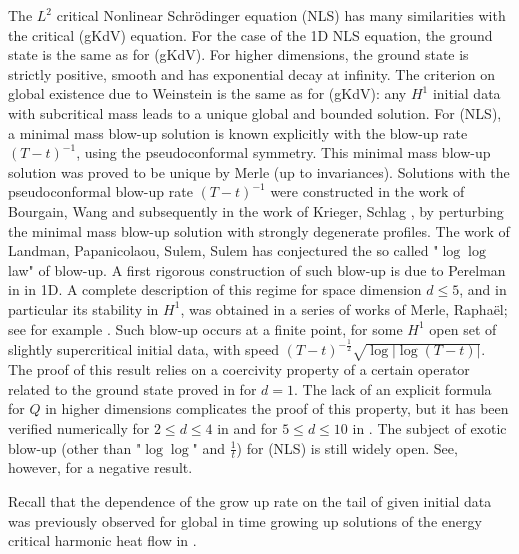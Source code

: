 \documentclass[16pt,english, oneside,reqno]{smfart}
\begin{document}
The $L^2$ critical Nonlinear Schr\"odinger equation (NLS) has many similarities with the critical (gKdV) equation. For the case of the 1D NLS equation, the ground state is the same as for (gKdV).
For higher dimensions, the ground state is strictly positive, smooth and has exponential decay 
at infinity.
The criterion on global existence due to Weinstein \cite{Weinstein-1983}
is the same as for (gKdV): any $H^1$ initial data with subcritical mass leads to
a unique global and bounded solution.
For (NLS), a minimal mass blow-up solution is known explicitly with the blow-up rate $(T-t)^{-1}$, using the pseudoconformal symmetry.
This minimal mass blow-up solution was proved to be unique by Merle \cite{Merle-1993-minmass-nls} (up to invariances).
Solutions with the pseudoconformal blow-up rate $(T-t)^{-1}$ were constructed in the work of Bourgain, Wang \cite{Bourgain-Wang-1998} and subsequently in the work of Krieger, Schlag \cite{Krieger-Schlag-2009}, by perturbing the minimal mass blow-up solution with strongly degenerate profiles.
The work of Landman, Papanicolaou, Sulem, Sulem \cite{LPSS-1988-first-blow-up-nls} has conjectured the so called "$\log\log$ law" of blow-up. A first rigorous construction of such blow-up is due to Perelman in \cite{Perelman-2001-nls-d1} in 1D.
A complete description of this regime for space dimension $d\leq 5$, and in particular its stability in $H^1$, was obtained in a series of works of Merle, Rapha\"el; see for example \cite{Merle-Raphael-profile-quant-2005, Merle-Raphael-crit-nls-2005}.
Such blow-up occurs at a finite point, for some $H^1$ open set of slightly supercritical initial data, with speed $(T-t)^{-\frac12}\sqrt{\log{|\log{(T-t)}|}}$.  
The proof of this result relies on a coercivity property of a certain operator related to the ground state proved in \cite{Merle-Raphael-crit-nls-2005} for $d=1$. The lack of an explicit formula for $Q$ in higher dimensions complicates the proof of this property, but it has been verified numerically for $2\leq d\leq 4$ in \cite{Fibich-Merle-Raphael-spec-prop-2006} and for $5\leq d \leq 10$ in \cite{Yang-Roudenko-Zhao-blowup-dynamics-2018}.
The subject of exotic blow-up (other than "$\log\log$" and $\frac{1}{t}$) for (NLS) is still widely open.
See, however, \cite{Raphael-2005} for a negative result.

Recall that the dependence of the grow up rate on the tail of given initial data was previously observed for global in time growing up solutions of the energy critical harmonic heat flow in \cite{Gustafson-Nakanishi-Tsai-asympt-2008}. %
\end{document}
